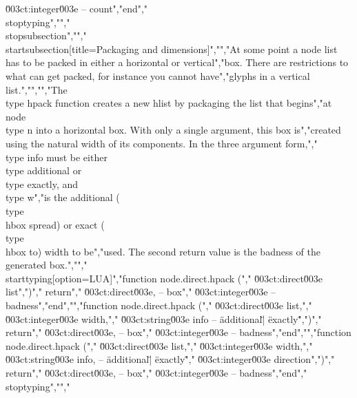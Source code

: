 \u003ct:integer\u003e -- count","end","\\stoptyping","","\\stopsubsection","","\\startsubsection[title=Packaging and dimensions]","","At some point a node list has to be packed in either a horizontal or vertical","box. There are restrictions to what can get packed, for instance you cannot have","glyphs in a vertical list.","","","The \\type {hpack} function creates a new hlist by packaging the list that begins","at node \\type {n} into a horizontal box. With only a single argument, this box is","created using the natural width of its components. In the three argument form,","\\type {info} must be either \\type {additional} or \\type {exactly}, and \\type {w}","is the additional (\\type {\\hbox spread}) or exact (\\type {\\hbox to}) width to be","used. The second return value is the badness of the generated box.","","\\starttyping[option=LUA]","function node.direct.hpack (","    \u003ct:direct\u003e list",")","    return","        \u003ct:direct\u003e, -- box","        \u003ct:integer\u003e -- badness","end","","function node.direct.hpack (","    \u003ct:direct\u003e  list,","    \u003ct:integer\u003e width,","    \u003ct:string\u003e  info -- \"additional\" | \"exactly\"",")","    return","        \u003ct:direct\u003e, -- box","        \u003ct:integer\u003e -- badness","end","","function node.direct.hpack (","    \u003ct:direct\u003e  list,","    \u003ct:integer\u003e width,","    \u003ct:string\u003e  info, -- \"additional\" | \"exactly\"","    \u003ct:integer\u003e direction",")","    return","        \u003ct:direct\u003e, -- box","        \u003ct:integer\u003e -- badness","end","\\stoptyping","","%